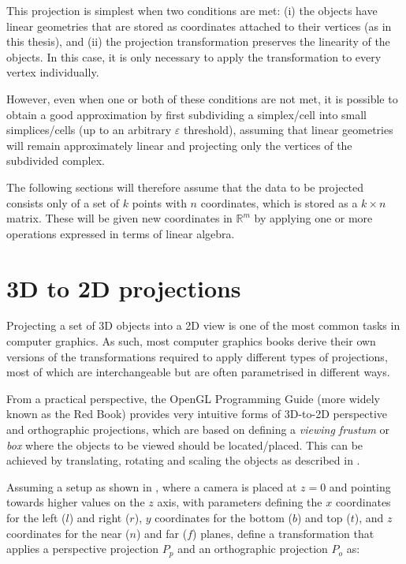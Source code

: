 This projection is simplest when two conditions are met: (i) the objects have linear geometries that are stored as coordinates attached to their vertices (as in this thesis), and (ii) the projection transformation preserves the linearity of the objects.
In this case, it is only necessary to apply the transformation to every vertex individually.

However, even when one or both of these conditions are not met, it is possible to obtain a good approximation by first subdividing a simplex/cell into small simplices/cells (up to an arbitrary $\varepsilon$ threshold), assuming that linear geometries will remain approximately linear and projecting only the vertices of the subdivided complex.

The following sections will therefore assume that the data to be projected consists only of a set of $k$ points with $n$ coordinates, which is stored as a $k \times n$ matrix.
These will be given new coordinates in $\mathbb{R}^m$ by applying one or more operations expressed in terms of linear algebra.

\section{3D to 2D projections}
\label{se:3dto2d}

Projecting a set of 3D objects into a 2D view is one of the most common tasks in computer graphics.
As such, most computer graphics books derive their own versions of the transformations required to apply different types of projections, most of which are interchangeable but are often parametrised in different ways.

From a practical perspective, the OpenGL Programming Guide (more widely known as the Red Book) \citep{Shreiner13} provides very intuitive forms of 3D-to-2D perspective and orthographic projections, which are based on defining a \emph{viewing frustum} or \emph{box} where the objects to be viewed should be located/placed.
This can be achieved by translating, rotating and scaling the objects as described in .

Assuming a setup as shown in , where a camera is placed at $z = 0$ and pointing towards higher values on the $z$ axis, with parameters defining the $x$ coordinates for the left ($l$) and right ($r$), $y$ coordinates for the bottom ($b$) and top ($t$), and $z$ coordinates for the near ($n$) and far ($f$) planes, \citet[Ch.~5]{Shreiner13} define a transformation that applies a perspective projection $P_p$ and an orthographic projection $P_o$ as:

